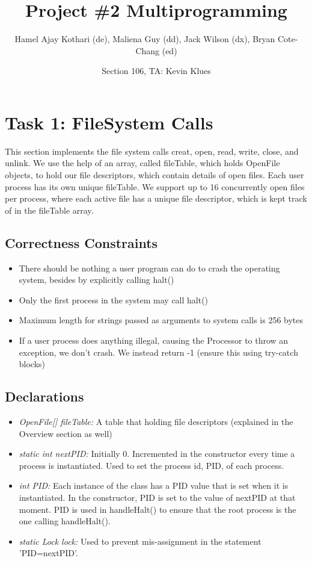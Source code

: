 \documentclass{article}
\begin{document}
\title{Project \#2 Multiprogramming}
\author{Hamel Ajay Kothari (de), Maliena Guy (dd), Jack Wilson (dx), Bryan Cote-Chang (ed)}
\date{Section 106, TA: Kevin Klues}
\maketitle

\section*{Task 1: FileSystem Calls}
This section implements the file system calls creat, open, read, write, close, and unlink.
We use the help of an array, called fileTable, which holds OpenFile objects, to hold our file descriptors, which contain details of open files. Each user process has its own unique fileTable.
We support up to 16 concurrently open files per process, where each active file has a unique file descriptor, which is kept track of in the fileTable array.

\subsection*{Correctness Constraints}
\begin{itemize}
\item There should be nothing a user program can do to crash the operating system, besides by explicitly calling halt()
\item Only the first process in the system may call halt()
\item Maximum length for strings passed as arguments to system calls is 256 bytes
\item If a user process does anything illegal, causing the Processor to throw an exception, we don't crash. We instead return -1 (ensure this using try-catch blocks)
\end{itemize}

\subsection*{Declarations}
\begin{itemize}
\item \textit{OpenFile[] fileTable:} A table that holding file descriptors (explained in the Overview section as well)
\item \textit{static int nextPID:} Initially 0. Incremented in the constructor every time a process is instantiated. Used to set the process id, PID, of each process.
\item \textit{int PID:} Each instance of the class has a PID value that is set when it is instantiated. In the constructor, PID is set to the value of nextPID at that moment.  PID is used in handleHalt() to ensure that the root process is the one calling handleHalt().
\item \textit{static Lock lock:} Used to prevent mis-assignment in the statement 'PID=nextPID'. 
 
\end{itemize}
\end{document}
